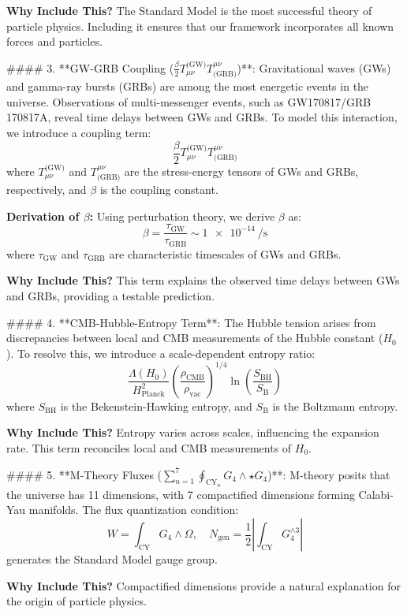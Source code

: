 \documentclass[12pt, a4paper]{article}
\begin{document}
\textbf{Why Include This?} The Standard Model is the most successful theory of particle physics. Including it ensures that our framework incorporates all known forces and particles.

#### 3. **GW-GRB Coupling ($\frac{\beta}{2} T_{\mu\nu}^{\text{(GW)}} T^{\mu\nu}_{\text{(GRB)}}$)**:
Gravitational waves (GWs) and gamma-ray bursts (GRBs) are among the most energetic events in the universe. Observations of multi-messenger events, such as GW170817/GRB 170817A, reveal time delays between GWs and GRBs. To model this interaction, we introduce a coupling term:
\[
\frac{\beta}{2} T_{\mu\nu}^{\text{(GW)}} T^{\mu\nu}_{\text{(GRB)}}
\]
where $T_{\mu\nu}^{\text{(GW)}}$ and $T^{\mu\nu}_{\text{(GRB)}}$ are the stress-energy tensors of GWs and GRBs, respectively, and $\beta$ is the coupling constant.

\textbf{Derivation of $\beta$:} Using perturbation theory, we derive $\beta$ as:
\[
\beta = \frac{\tau_{\text{GW}}}{\tau_{\text{GRB}}} \sim \SI{1e-14}{\per\second}
\]
where $\tau_{\text{GW}}$ and $\tau_{\text{GRB}}$ are characteristic timescales of GWs and GRBs.

\textbf{Why Include This?} This term explains the observed time delays between GWs and GRBs, providing a testable prediction.

#### 4. **CMB-Hubble-Entropy Term**:
The Hubble tension arises from discrepancies between local and CMB measurements of the Hubble constant ($H_0$). To resolve this, we introduce a scale-dependent entropy ratio:
\[
\frac{\Lambda(H_0)}{H_{\text{Planck}}^2} \left( \frac{\rho_{\text{CMB}}}{\rho_{\text{vac}}} \right)^{1/4} \ln\left(\frac{S_{\text{BH}}}{S_{\text{B}}}\right)
\]
where $S_{\text{BH}}$ is the Bekenstein-Hawking entropy, and $S_{\text{B}}$ is the Boltzmann entropy.

\textbf{Why Include This?} Entropy varies across scales, influencing the expansion rate. This term reconciles local and CMB measurements of $H_0$.

#### 5. **M-Theory Fluxes ($\sum_{n=1}^7 \oint_{\text{CY}_n} G_4 \wedge \star G_4$)**:
M-theory posits that the universe has 11 dimensions, with 7 compactified dimensions forming Calabi-Yau manifolds. The flux quantization condition:
\[
W = \int_{\text{CY}} G_4 \wedge \Omega,\quad N_{\text{gen}} = \frac{1}{2} \left| \int_{\text{CY}} G_4^{\wedge 3} \right|
\]
generates the Standard Model gauge group.

\textbf{Why Include This?} Compactified dimensions provide a natural explanation for the origin of particle physics.
\end{document}
